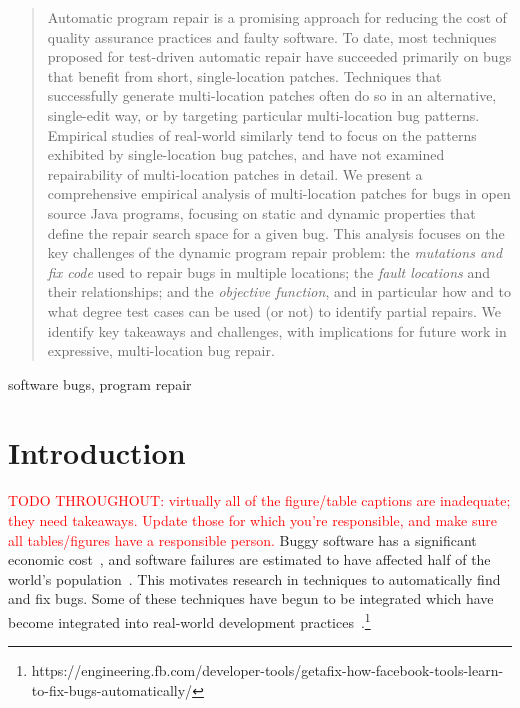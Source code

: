 \documentclass[10pt, conference]{IEEEtran}
\newcommand\todo[1]{\textcolor{red}{#1}}
\begin{document}
\begin{abstract}
    Automatic program repair is a promising approach for reducing the
    cost of quality assurance practices and faulty software. To date, most
    techniques proposed for test-driven automatic repair have succeeded
    primarily on bugs that benefit from short, single-location patches. Techniques
    that successfully generate multi-location patches often do so in an
    alternative, single-edit way, or by targeting particular multi-location bug
    patterns. Empirical studies of real-world similarly tend to focus on the
    patterns exhibited by single-location bug patches, and have not examined repairability
    of multi-location patches in detail. We present a comprehensive empirical analysis
    of multi-location patches for bugs in open source Java programs, focusing on static and
    dynamic properties that define the repair search space for a given bug.
    This analysis focuses on the key challenges of the dynamic program repair
    problem: the \emph{mutations and fix code} used to repair bugs in multiple locations;
    the \emph{fault locations} and their relationships; and the \emph{objective
      function}, and in particular how and to what degree test cases can be used
    (or not) to identify partial repairs. We identify key takeaways and
    challenges, with implications for future work in expressive, multi-location bug
    repair.
\end{abstract}

\begin{IEEEkeywords}
  software bugs, program repair
\end{IEEEkeywords}

\newcommand{\rqorinsight}[2]{
  \setlength{\fboxsep}{0.8em}
  \vspace{0.5em}
  \begin{center}
  \Ovalbox{\begin{minipage}{0.9\linewidth}
    \textbf{RQ#1:} #2
    \end{minipage}}
  \end{center}
  \vspace{0.5em}}

\section{Introduction}


\todo{TODO THROUGHOUT: virtually all of the figure/table captions are
  inadequate; they need takeaways.  Update those for which you're responsible,
  and make sure all tables/figures have a responsible person.}
Buggy software has a significant economic cost~\cite{cambridge-study}, and
software failures are estimated to have affected half of the world's
population~\cite{tricentis}.  This motivates research in
techniques to automatically find and fix bugs.  Some of these techniques have
begun to be integrated  which have become integrated into
real-world development practices~\cite{iceland,sapfix}.\footnote{https://engineering.fb.com/developer-tools/getafix-how-facebook-tools-learn-to-fix-bugs-automatically/}
\end{document}
